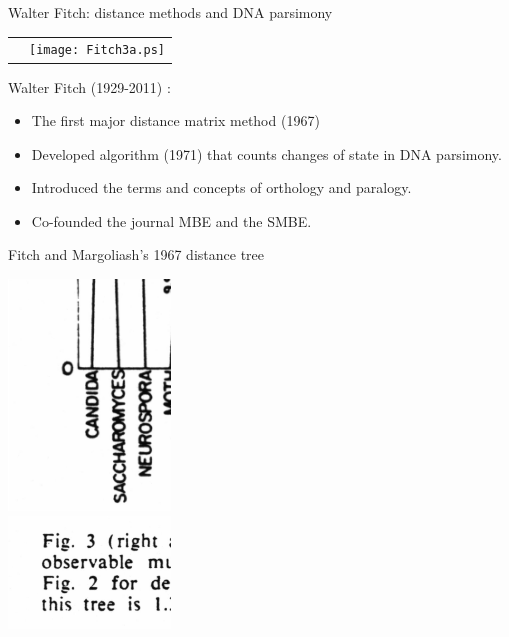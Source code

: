 \documentclass[pdf,bluish,slideColor,colorBG]{prosper}
\begin{document}
\begin{slide}[Replace]{Walter Fitch: distance methods and DNA parsimony}

\begin{center}
\begin{tabular}{c c}
& \texttt{[image: Fitch3a.ps]}\\
\end{tabular}
\end{center}

Walter Fitch (1929-2011) :

{
\begin{itemize}
\item The first major distance matrix method (1967)
\item Developed algorithm (1971) that counts changes of state in DNA parsimony.
\item Introduced the terms and concepts of orthology and paralogy.
\item Co-founded the journal MBE and the SMBE.
\end{itemize}
}

\end{slide}

\begin{slide}[Replace]{Fitch and Margoliash's 1967 distance tree}

\begin{center}
\includegraphics[width=1.7in]{fitchtree.ps}\\
\includegraphics[width=1.7in]{fitchcaption.ps}\\
\end{center}

\end{slide}
\end{document}
